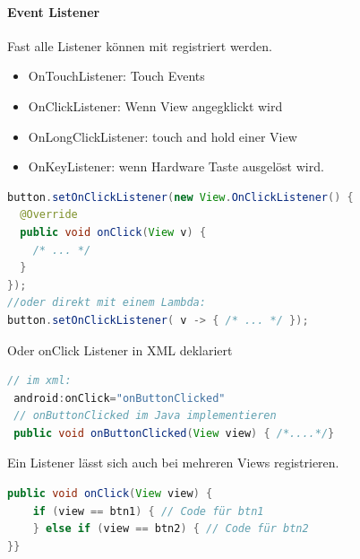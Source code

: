 \paragraph{Event Listener}
Fast alle Listener können mit  registriert werden.
\begin{itemize}
    \item OnTouchListener: Touch Events
    \item OnClickListener: Wenn View angegklickt wird
    \item OnLongClickListener: touch and hold einer View
    \item OnKeyListener: wenn Hardware Taste ausgelöst wird.
\end{itemize}
\begin{lstlisting}[language=java]
button.setOnClickListener(new View.OnClickListener() {
  @Override
  public void onClick(View v) {
    /* ... */
  }
});
//oder direkt mit einem Lambda:
button.setOnClickListener( v -> { /* ... */ }); 
\end{lstlisting}
Oder onClick Listener in XML deklariert
 \begin{lstlisting}[language=java]
 // im xml:
 android:onClick="onButtonClicked"
 // onButtonClicked im Java implementieren
 public void onButtonClicked(View view) { /*....*/}
 \end{lstlisting}

Ein Listener lässt sich auch bei mehreren Views registrieren.
\begin{lstlisting}[language=java]
public void onClick(View view) {
    if (view == btn1) { // Code für btn1
    } else if (view == btn2) { // Code für btn2
}}
\end{lstlisting}

